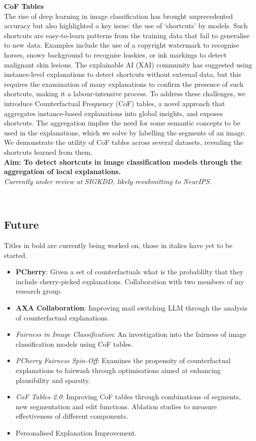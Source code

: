 \noindent
\textbf{CoF Tables}\\
The rise of deep learning in image classification has brought unprecedented accuracy but also highlighted a key 
issue: the use of `shortcuts' by models. Such shortcuts are easy-to-learn patterns from the training data that 
fail to generalise to new data. Examples include the use of a copyright watermark to recognise horses, snowy 
background to recognise huskies, or ink markings to detect malignant skin lesions. The explainable AI (XAI) 
community has suggested using instance-level explanations to detect shortcuts without external data, 
but this requires the examination of many explanations to confirm the presence of such shortcuts, making it a 
labour-intensive process. To address these challenges, we introduce Counterfactual Frequency (CoF) tables, 
a novel approach that aggregates instance-based explanations into global insights, and exposes shortcuts. 
The aggregation implies the need for some semantic concepts to be used in the explanations, which we solve by 
labelling the segments of an image. We demonstrate the utility of CoF tables across several datasets, revealing 
the shortcuts learned from them.\\
\textbf{Aim: To detect shortcuts in image classification models through the aggregation of local explanations.}\\
\textit{Currently under review at SIGKDD, likely resubmitting to NeurIPS.}

\

\subsection*{Future}

Titles in bold are currently being worked on, those in italics have yet to be started.

\begin{itemize}
    \item \textbf{PCherry}: Given a set of counterfactuals what is the probablilty that they include 
    cherry-picked explanations. Collaboration with two members of my research group.
    \item \textbf{AXA Collaboration}: Improving mail switching LLM through the analysis of counterfactual explanations.
    \item \textit{Fairness in Image Classification}: An investigation into the fairness of image classification 
    models using CoF tables.
    \item \textit{PCherry Fairness Spin-Off}: Examines the propensity of counterfactual explanations to 
    fairwash through optimisations aimed at enhancing plausibility and sparsity.
    \item \textit{CoF Tables 2.0}: Improving CoF tables through combinations of segments, 
    new segmentation and edit functions. Ablation studies to measure effectiveness of different components.
    \item Personalised Explanation Improvement.
\end{itemize}